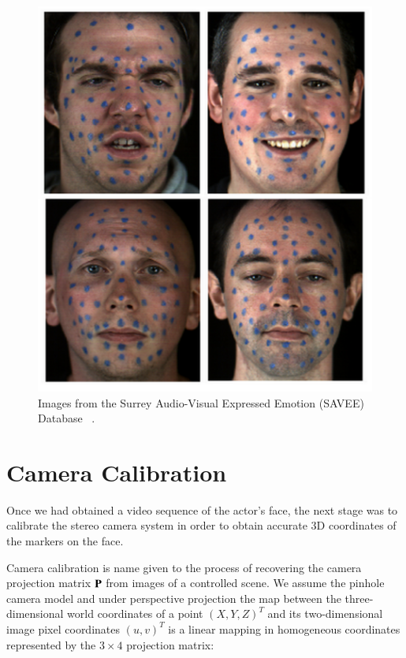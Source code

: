 \begin{figure}[htbp!]
\begin{minipage}[b]{0.5\textwidth}
\includegraphics[width=\textwidth]{img/surreydata}
	\caption{ Images from the Surrey Audio-Visual Expressed Emotion (SAVEE) Database ~\cite{Surrey}.}
	\label{fig:surreydata}	
\end{minipage}
\end{figure}


\section{Camera Calibration}

Once we had obtained a video sequence of the actor's face, the next stage was to calibrate the stereo camera system in order to obtain accurate 3D coordinates of the markers on the face. 

Camera calibration is name given to the process of recovering the camera projection matrix $\mathbf{P}$ from images of a controlled scene. We assume the pinhole camera model and under perspective projection the map between the three-dimensional world coordinates of a point $(X, Y, Z)^T$ and its two-dimensional image pixel coordinates $(u, v)^T$ is a linear mapping in homogeneous coordinates represented by the $3 \times 4$ projection matrix:


